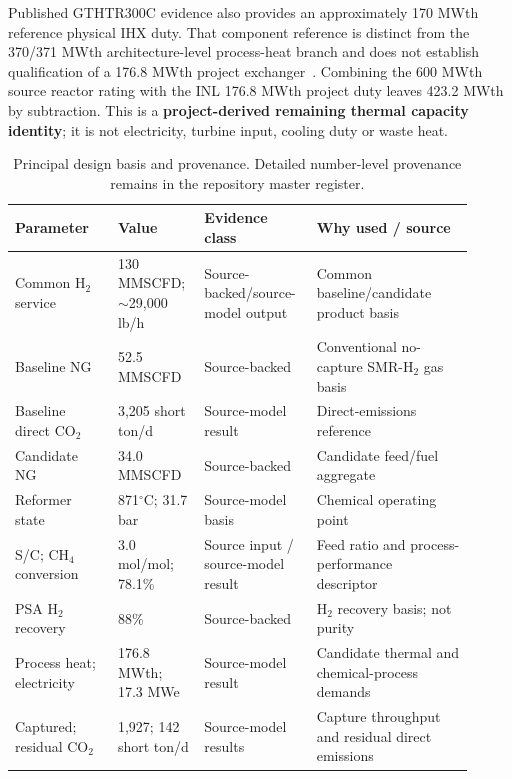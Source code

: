 Published GTHTR300C evidence also provides an approximately 170 MWth reference physical IHX duty. That component reference is distinct from the 370/371 MWth architecture-level process-heat branch and does not establish qualification of a 176.8 MWth project exchanger~\cite{jaeri2004gthtr300c,nishihara2007potential}. Combining the 600 MWth source reactor rating with the INL 176.8 MWth project duty leaves 423.2 MWth by subtraction. This is a \textbf{project-derived remaining thermal capacity identity}; it is not electricity, turbine input, cooling duty or waste heat.

\begin{table}[htbp]
\centering\small
\caption{Principal design basis and provenance. Detailed number-level provenance remains in the repository master register.}
\label{tab:principal-design-basis}
\begin{tabular}{p{0.21\linewidth}p{0.16\linewidth}p{0.22\linewidth}p{0.32\linewidth}}
\toprule
Parameter & Value & Evidence class & Why used / source \\ \midrule
Common H$_2$ service & 130 MMSCFD; \newline $\sim$29,000 lb/h & Source-backed/source-model output & Common baseline/candidate product basis~\cite{inltev953,inltev961} \\
Baseline NG & 52.5 MMSCFD & Source-backed & Conventional no-capture SMR-H$_2$ gas basis~\cite{inltev953} \\
Baseline direct CO$_2$ & 3,205 short ton/d & Source-model result & Direct-emissions reference~\cite{inltev953} \\
Candidate NG & 34.0 MMSCFD & Source-backed & Candidate feed/fuel aggregate~\cite{inltev961} \\
Reformer state & 871$^\circ$C; 31.7 bar & Source-model basis & Chemical operating point~\cite{inltev953,inltev961} \\
S/C; CH$_4$ conversion & 3.0 mol/mol; 78.1\% & Source input / source-model result & Feed ratio and process-performance descriptor~\cite{inltev953} \\
PSA H$_2$ recovery & 88\% & Source-backed & H$_2$ recovery basis; not purity~\cite{inltev953} \\
Process heat; electricity & 176.8 MWth; 17.3 MWe & Source-model result & Candidate thermal and chemical-process demands~\cite{inltev961} \\
Captured; residual CO$_2$ & 1,927; 142 short ton/d & Source-model results & Capture throughput and residual direct emissions~\cite{inltev961} \\

\end{tabular}
\end{table}
